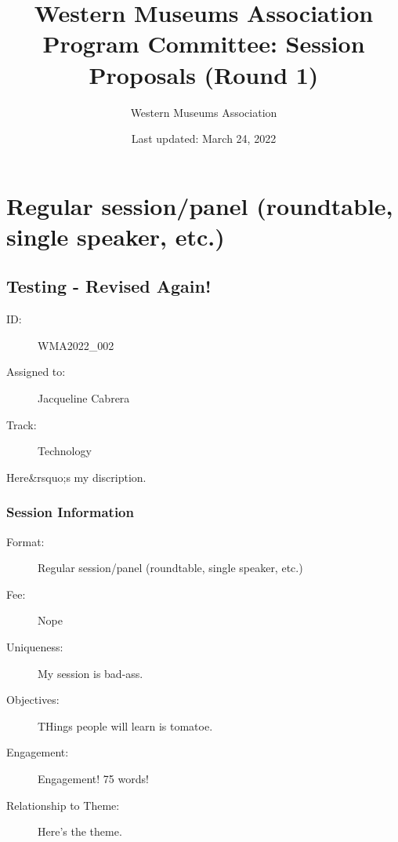 \documentclass{report}
\title{ Western Museums Association Program Committee: Session Proposals (Round 1)}
\date{ Last updated: March 24, 2022}
\author{Western Museums Association}
\begin{document}
  \maketitle
  \newpage
  \tableofcontents
  \newpage
  
    \newpage
    \chapter*{ Regular session/panel (roundtable, single speaker, etc.) }

      
        
        
        
        
        
          \newpage
          \section{ Testing - Revised Again! }
            \begin{description}
              \item [ID:]
              WMA2022\_002

              \item [Assigned to:]Jacqueline Cabrera~
                \item [Track:]Technology~
              \end{description}

              Here\&rsquo;s my discription.

              \subsection*{Session Information}
                \begin{description}
                  \item [Format:] Regular session/panel (roundtable, single speaker, etc.)
							    
								  \item [Fee:]Nope
							     
							    \item [Uniqueness:]My session is bad-ass.
							    \item [Objectives:]THings people will learn is tomatoe.
							    \item [Engagement:]Engagement! 75 words!
							    \item [Relationship to Theme:]Here's the theme.
							    
                \end{description}
\end{document}
